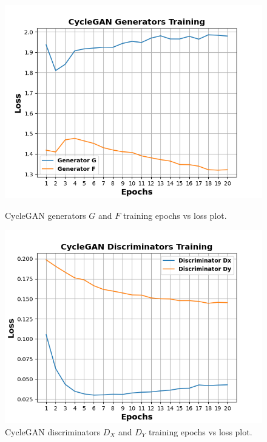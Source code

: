 \begin{figure}[H]
  \centering
  \begin{minipage}[b]{0.49\textwidth}
    \includegraphics[width=\textwidth]{images/Evaluation/CycleGANGeneratorsTraining.png}
    \caption[\ac{CycleGAN} generators $G$ and $F$ training epochs vs loss plot.]{\ac{CycleGAN} generators $G$ and $F$ training epochs vs loss plot.}
    \label{fig:CycleGANGeneratorsTraining}
  \end{minipage}
  \hfill
  \begin{minipage}[b]{0.49\textwidth}
    \includegraphics[width=\textwidth]{images/Evaluation/CycleGANDiscriminatorsTraining.png}
    \caption[\ac{CycleGAN} discriminators $D_X$ and $D_Y$ training epochs vs loss plot.]{\ac{CycleGAN} discriminators $D_X$ and $D_Y$ training epochs vs loss plot.}
    \label{fig:CycleGANDiscriminatorsTraining}
  \end{minipage}
\end{figure}


